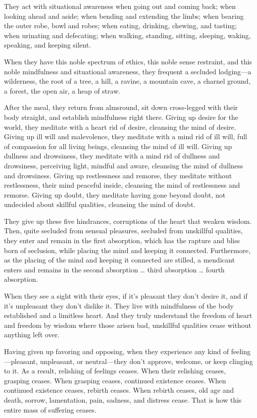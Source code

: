\documentclass[12pt,openany]{book}%
\begin{document}
They act with situational awareness when going out and coming back; when looking ahead and aside; when bending and extending the limbs; when bearing the outer robe, bowl and robes; when eating, drinking, chewing, and tasting; when urinating and defecating; when walking, standing, sitting, sleeping, waking, speaking, and keeping silent. 

When they have this noble spectrum of ethics, this noble sense restraint, and this noble mindfulness and situational awareness, they frequent a secluded lodging—a wilderness, the root of a tree, a hill, a ravine, a mountain cave, a charnel ground, a forest, the open air, a heap of straw. 

After the meal, they return from almsround, sit down cross-legged with their body straight, and establish mindfulness right there. Giving up desire for the world, they meditate with a heart rid of desire, cleansing the mind of desire. Giving up ill will and malevolence, they meditate with a mind rid of ill will, full of compassion for all living beings, cleansing the mind of ill will. Giving up dullness and drowsiness, they meditate with a mind rid of dullness and drowsiness, perceiving light, mindful and aware, cleansing the mind of dullness and drowsiness. Giving up restlessness and remorse, they meditate without restlessness, their mind peaceful inside, cleansing the mind of restlessness and remorse. Giving up doubt, they meditate having gone beyond doubt, not undecided about skillful qualities, cleansing the mind of doubt. 

They give up these five hindrances, corruptions of the heart that weaken wisdom. Then, quite secluded from sensual pleasures, secluded from unskillful qualities, they enter and remain in the first absorption, which has the rapture and bliss born of seclusion, while placing the mind and keeping it connected. Furthermore, as the placing of the mind and keeping it connected are stilled, a mendicant enters and remains in the second absorption … third absorption … fourth absorption. 

When they see a sight with their eyes, if it’s pleasant they don’t desire it, and if it’s unpleasant they don’t dislike it. They live with mindfulness of the body established and a limitless heart. And they truly understand the freedom of heart and freedom by wisdom where those arisen bad, unskillful qualities cease without anything left over. 

Having given up favoring and opposing, when they experience any kind of feeling—pleasant, unpleasant, or neutral—they don’t approve, welcome, or keep clinging to it. As a result, relishing of feelings ceases. When their relishing ceases, grasping ceases. When grasping ceases, continued existence ceases. When continued existence ceases, rebirth ceases. When rebirth ceases, old age and death, sorrow, lamentation, pain, sadness, and distress cease. That is how this entire mass of suffering ceases. 
\end{document}
